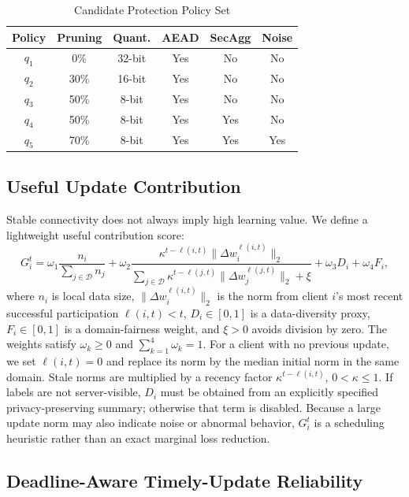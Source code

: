 \documentclass[preprint,12pt]{elsarticle}
\begin{document}
\begin{table}[t]
	\centering
	\caption{Candidate Protection Policy Set}
	\label{tab:policy_set}
	\scriptsize
	\setlength{\tabcolsep}{3pt}
	\begin{tabular}{c c c c c c}
		\hline
		Policy & Pruning & Quant. & AEAD & SecAgg & Noise \\
		\hline
		$q_1$ & 0\%  & 32-bit & Yes & No  & No \\
		$q_2$ & 30\% & 16-bit & Yes & No  & No \\
		$q_3$ & 50\% & 8-bit  & Yes & No  & No \\
		$q_4$ & 50\% & 8-bit  & Yes & Yes & No \\
		$q_5$ & 70\% & 8-bit  & Yes & Yes & Yes \\
		\hline
	\end{tabular}
\end{table}

\subsection{Useful Update Contribution}

Stable connectivity does not always imply high learning value. We define a lightweight useful contribution score:
\begin{equation}
	G_i^t =
	\omega_1
	\frac{n_i}{\sum_{j \in \mathcal{D}} n_j}
	+
	\omega_2
	\frac{\kappa^{t-\ell(i,t)}\|\Delta w_i^{\ell(i,t)}\|_2}
	{\sum_{j \in \mathcal{D}}\kappa^{t-\ell(j,t)}\|\Delta w_j^{\ell(j,t)}\|_2 + \xi}
	+
	\omega_3 D_i
	+
	\omega_4 F_i,
	\label{eq:contribution}
\end{equation}
where $n_i$ is local data size, $\|\Delta w_i^{\ell(i,t)}\|_2$ is the norm from client $i$'s most recent successful participation $\ell(i,t)<t$, $D_i\in[0,1]$ is a data-diversity proxy, $F_i\in[0,1]$ is a domain-fairness weight, and $\xi>0$ avoids division by zero. The weights satisfy $\omega_k\geq0$ and $\sum_{k=1}^4\omega_k=1$. For a client with no previous update, we set $\ell(i,t)=0$ and replace its norm by the median initial norm in the same domain. Stale norms are multiplied by a recency factor $\kappa^{t-\ell(i,t)}$, $0<\kappa\leq1$. If labels are not server-visible, $D_i$ must be obtained from an explicitly specified privacy-preserving summary; otherwise that term is disabled. Because a large update norm may also indicate noise or abnormal behavior, $G_i^t$ is a scheduling heuristic rather than an exact marginal loss reduction.

\subsection{Deadline-Aware Timely-Update Reliability}
\end{document}
